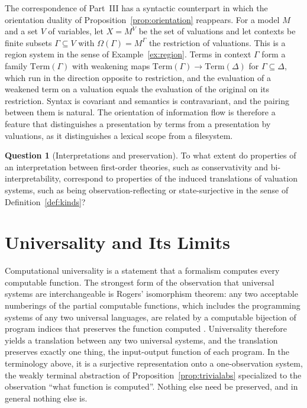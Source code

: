 \documentclass[11pt]{article}
\theoremstyle{definition}
\newtheorem{question}[theorem]{Question}
\theoremstyle{remark}
\begin{document}
The correspondence of Part~III has a syntactic counterpart in which the orientation duality of Proposition~\ref{prop:orientation} reappears. For a model $M$ and a set $V$ of variables, let $X=M^V$ be the set of valuations and let contexts be finite subsets $\Gamma\subseteq V$ with $\Omega(\Gamma)=M^{\Gamma}$ the restriction of valuations. This is a region system in the sense of Example~\ref{ex:region}. Terms in context $\Gamma$ form a family $\mathrm{Term}(\Gamma)$ with weakening maps $\mathrm{Term}(\Gamma)\to\mathrm{Term}(\Delta)$ for $\Gamma\subseteq\Delta$, which run in the direction opposite to restriction, and the evaluation of a weakened term on a valuation equals the evaluation of the original on its restriction. Syntax is covariant and semantics is contravariant, and the pairing between them is natural. The orientation of information flow is therefore a feature that distinguishes a presentation by terms from a presentation by valuations, as it distinguishes a lexical scope from a filesystem.

\begin{question}[Interpretations and preservation]\label{q:interp}
To what extent do properties of an interpretation between first-order theories, such as conservativity and bi-interpretability, correspond to properties of the induced translations of valuation systems, such as being observation-reflecting or state-surjective in the sense of Definition~\ref{def:kinds}?
\end{question}

\section{Universality and Its Limits}

Computational universality is a statement that a formalism computes every computable function. The strongest form of the observation that universal systems are interchangeable is Rogers' isomorphism theorem: any two acceptable numberings of the partial computable functions, which includes the programming systems of any two universal languages, are related by a computable bijection of program indices that preserves the function computed \cite{rogers}. Universality therefore yields a translation between any two universal systems, and the translation preserves exactly one thing, the input-output function of each program. In the terminology above, it is a surjective representation onto a one-observation system, the weakly terminal abstraction of Proposition~\ref{prop:trivialabs} specialized to the observation ``what function is computed''. Nothing else need be preserved, and in general nothing else is.
\end{document}
